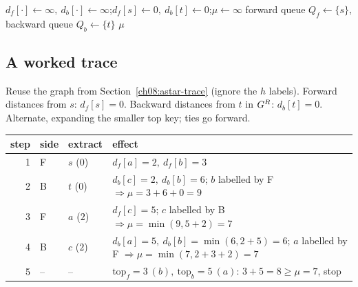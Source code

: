 \begin{algorithm}[H]
\DontPrintSemicolon
{}
$d_f[\cdot]\gets\infty,\ d_b[\cdot]\gets\infty$;\quad $d_f[s]\gets0,\ d_b[t]\gets0$;\quad $\mu\gets\infty$\;
forward queue $Q_f\gets\{s\}$, backward queue $Q_b\gets\{t\}$\;
\Return $\mu$\;
\caption{Bidirectional Dijkstra}
\label{ch08:alg-bidir}
\end{algorithm}

\subsection{A worked trace}

Reuse the graph from Section~\ref{ch08:astar-trace} (ignore the $h$ labels).
Forward distances from $s$: $d_f[s]=0$. Backward distances from $t$ in $G^R$:
$d_b[t]=0$. Alternate, expanding the smaller top key; ties go forward.

\begin{center}\small
\begin{tabular}{r l l l}
\toprule
step & side & extract & effect \\
\midrule
1 & F & $s$ ($0$)  & $d_f[a]=2,\ d_f[b]=3$\\
2 & B & $t$ ($0$)  & $d_b[c]=2,\ d_b[b]=6$; $b$ labelled by F $\Rightarrow \mu=3+6+0=9$\\
3 & F & $a$ ($2$)  & $d_f[c]=5$; $c$ labelled by B $\Rightarrow \mu=\min(9,5+2)=7$\\
4 & B & $c$ ($2$)  & $d_b[a]=5,\ d_b[b]=\min(6,2+5)=6$; $a$ labelled by F $\Rightarrow \mu=\min(7,2+3+2)=7$\\
5 & -- & --        & $\mathrm{top}_f{=}3\ (b),\ \mathrm{top}_b{=}5\ (a)$: $3+5=8\ge\mu=7$, stop \\
\bottomrule
\end{tabular}
\end{center}

